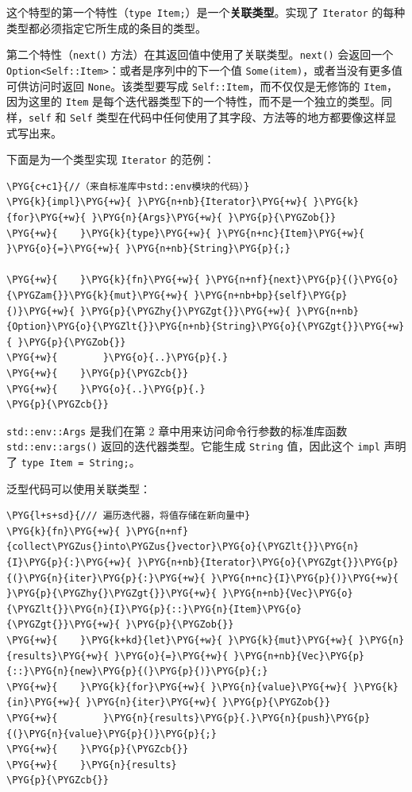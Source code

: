 这个特型的第一个特性（\texttt{type Item;}）是一个\textbf{关联类型}。实现了 \texttt{Iterator} 的每种类型都必须指定它所生成的条目的类型。

第二个特性（\texttt{next()} 方法）在其返回值中使用了关联类型。\texttt{next()} 会返回一个 \texttt{Option<Self::Item>}：或者是序列中的下一个值 \texttt{Some(item)}，或者当没有更多值可供访问时返回 \texttt{None}。该类型要写成 \texttt{Self::Item}，而不仅仅是无修饰的 \texttt{Item}，因为这里的 \texttt{Item} 是每个迭代器类型下的一个特性，而不是一个独立的类型。同样，\texttt{self} 和 \texttt{Self} 类型在代码中任何使用了其字段、方法等的地方都要像这样显式写出来。

下面是为一个类型实现 \texttt{Iterator} 的范例：

\begin{Verbatim}[commandchars=\\\{\},breaklines=true,breakanywhere=true,fontsize=\codefont,xleftmargin=17bp]
\PYG{c+c1}{//（来自标准库中std::env模块的代码）}
\PYG{k}{impl}\PYG{+w}{ }\PYG{n+nb}{Iterator}\PYG{+w}{ }\PYG{k}{for}\PYG{+w}{ }\PYG{n}{Args}\PYG{+w}{ }\PYG{p}{\PYGZob{}}
\PYG{+w}{    }\PYG{k}{type}\PYG{+w}{ }\PYG{n+nc}{Item}\PYG{+w}{ }\PYG{o}{=}\PYG{+w}{ }\PYG{n+nb}{String}\PYG{p}{;}

\PYG{+w}{    }\PYG{k}{fn}\PYG{+w}{ }\PYG{n+nf}{next}\PYG{p}{(}\PYG{o}{\PYGZam{}}\PYG{k}{mut}\PYG{+w}{ }\PYG{n+nb+bp}{self}\PYG{p}{)}\PYG{+w}{ }\PYG{p}{\PYGZhy{}\PYGZgt{}}\PYG{+w}{ }\PYG{n+nb}{Option}\PYG{o}{\PYGZlt{}}\PYG{n+nb}{String}\PYG{o}{\PYGZgt{}}\PYG{+w}{ }\PYG{p}{\PYGZob{}}
\PYG{+w}{        }\PYG{o}{..}\PYG{p}{.}
\PYG{+w}{    }\PYG{p}{\PYGZcb{}}
\PYG{+w}{    }\PYG{o}{..}\PYG{p}{.}
\PYG{p}{\PYGZcb{}}
\end{Verbatim}

\texttt{std::env::Args} 是我们在第 2 章中用来访问命令行参数的标准库函数 \texttt{std::env::args()} 返回的迭代器类型。它能生成 \texttt{String} 值，因此这个 \texttt{impl} 声明了 \texttt{type Item = String;}。

泛型代码可以使用关联类型：

\begin{Verbatim}[commandchars=\\\{\},breaklines=true,breakanywhere=true,fontsize=\codefont,xleftmargin=17bp]
\PYG{l+s+sd}{/// 遍历迭代器，将值存储在新向量中}
\PYG{k}{fn}\PYG{+w}{ }\PYG{n+nf}{collect\PYGZus{}into\PYGZus{}vector}\PYG{o}{\PYGZlt{}}\PYG{n}{I}\PYG{p}{:}\PYG{+w}{ }\PYG{n+nb}{Iterator}\PYG{o}{\PYGZgt{}}\PYG{p}{(}\PYG{n}{iter}\PYG{p}{:}\PYG{+w}{ }\PYG{n+nc}{I}\PYG{p}{)}\PYG{+w}{ }\PYG{p}{\PYGZhy{}\PYGZgt{}}\PYG{+w}{ }\PYG{n+nb}{Vec}\PYG{o}{\PYGZlt{}}\PYG{n}{I}\PYG{p}{::}\PYG{n}{Item}\PYG{o}{\PYGZgt{}}\PYG{+w}{ }\PYG{p}{\PYGZob{}}
\PYG{+w}{    }\PYG{k+kd}{let}\PYG{+w}{ }\PYG{k}{mut}\PYG{+w}{ }\PYG{n}{results}\PYG{+w}{ }\PYG{o}{=}\PYG{+w}{ }\PYG{n+nb}{Vec}\PYG{p}{::}\PYG{n}{new}\PYG{p}{(}\PYG{p}{)}\PYG{p}{;}
\PYG{+w}{    }\PYG{k}{for}\PYG{+w}{ }\PYG{n}{value}\PYG{+w}{ }\PYG{k}{in}\PYG{+w}{ }\PYG{n}{iter}\PYG{+w}{ }\PYG{p}{\PYGZob{}}
\PYG{+w}{        }\PYG{n}{results}\PYG{p}{.}\PYG{n}{push}\PYG{p}{(}\PYG{n}{value}\PYG{p}{)}\PYG{p}{;}
\PYG{+w}{    }\PYG{p}{\PYGZcb{}}
\PYG{+w}{    }\PYG{n}{results}
\PYG{p}{\PYGZcb{}}
\end{Verbatim}

